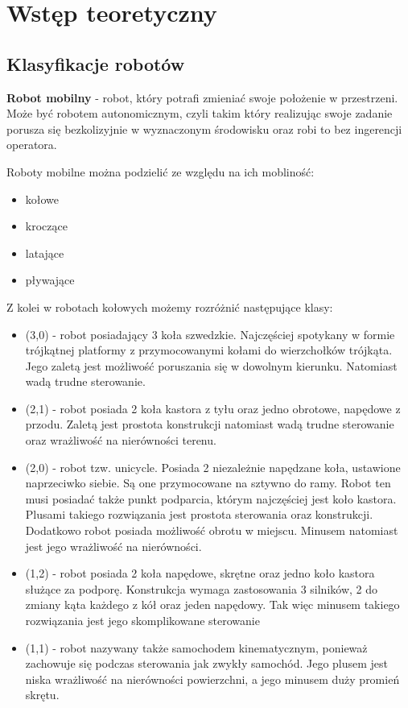 

\chapter{Wstęp teoretyczny}
    \section{Klasyfikacje robotów}
    	\textbf{Robot mobilny} - robot, który potrafi zmieniać swoje położenie w przestrzeni. Może być robotem autonomicznym, czyli takim który realizując swoje zadanie porusza się bezkolizyjnie w wyznaczonym środowisku oraz robi to bez ingerencji operatora.
    	
    	Roboty mobilne można podzielić ze względu na ich mobliność:
    	\begin{itemize}
    		\item kołowe
    		\item kroczące
    		\item latające
    		\item pływające
    	\end{itemize}
    	Z kolei w robotach kołowych możemy rozróżnić następujące klasy:
    	\begin{itemize}
    		\item (3,0) - robot posiadający 3 koła szwedzkie. Najczęściej spotykany w formie trójkątnej platformy z przymocowanymi kołami do wierzchołków trójkąta. Jego zaletą jest możliwość poruszania się w dowolnym kierunku. Natomiast wadą trudne sterowanie.
    		\item (2,1) - robot posiada 2 koła kastora z tyłu oraz jedno obrotowe, napędowe z przodu. Zaletą jest prostota konstrukcji natomiast wadą trudne sterowanie oraz wrażliwość na nierówności terenu.
    		\item (2,0) - robot tzw. unicycle. Posiada 2 niezależnie napędzane koła, ustawione naprzeciwko siebie. Są one przymocowane na sztywno do ramy. Robot ten musi posiadać także punkt podparcia, którym najczęściej jest koło kastora. Plusami takiego rozwiązania jest prostota sterowania oraz konstrukcji. Dodatkowo robot posiada możliwość obrotu w miejscu. Minusem natomiast jest jego wrażliwość na nierówności.
    		\item (1,2) - robot posiada 2 koła napędowe, skrętne oraz jedno koło kastora służące za podporę. Konstrukcja wymaga zastosowania 3 silników, 2 do zmiany kąta każdego z kół oraz jeden napędowy. Tak więc minusem takiego rozwiązania jest jego skomplikowane sterowanie
    		\item (1,1) - robot nazywany także samochodem kinematycznym, ponieważ zachowuje się podczas sterowania jak zwykły samochód. Jego plusem jest niska wrażliwość na nierówności powierzchni, a jego minusem duży promień skrętu.
    	\end{itemize}
    	
